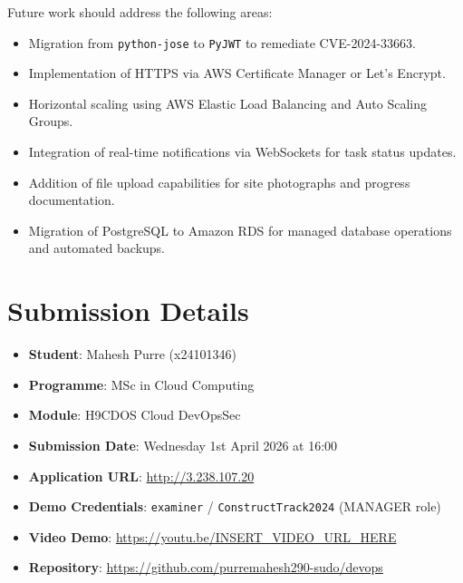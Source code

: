 \documentclass[conference]{IEEEtran}
\begin{document}
Future work should address the following areas:

\begin{itemize}[noitemsep]
    \item Migration from \texttt{python-jose} to \texttt{PyJWT} to remediate CVE-2024-33663.
    \item Implementation of HTTPS via AWS Certificate Manager or Let's Encrypt.
    \item Horizontal scaling using AWS Elastic Load Balancing and Auto Scaling Groups.
    \item Integration of real-time notifications via WebSockets for task status updates.
    \item Addition of file upload capabilities for site photographs and progress documentation.
    \item Migration of PostgreSQL to Amazon RDS for managed database operations and automated backups.
\end{itemize}

\section*{Submission Details}

\begin{itemize}[noitemsep]
    \item \textbf{Student}: Mahesh Purre (x24101346)
    \item \textbf{Programme}: MSc in Cloud Computing
    \item \textbf{Module}: H9CDOS Cloud DevOpsSec
    \item \textbf{Submission Date}: Wednesday 1st April 2026 at 16:00
    \item \textbf{Application URL}: \url{http://3.238.107.20}
    \item \textbf{Demo Credentials}: \texttt{examiner} / \texttt{ConstructTrack2024} (MANAGER role)
    \item \textbf{Video Demo}: \url{https://youtu.be/INSERT\_VIDEO\_URL\_HERE}
    \item \textbf{Repository}: \url{https://github.com/purremahesh290-sudo/devops}
\end{itemize}
\end{document}
